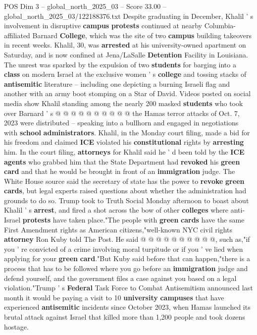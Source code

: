 \begin{textsample}{POS Dim 3 – global\_north\_2025\_03 – Score 33.00 – global\_north\_2025\_03/122188376.txt}
Despite graduating in December, Khalil ' s involvement in disruptive \textbf{campus} \textbf{protests} continued at nearby Columbia-affiliated Barnard \textbf{College}, which was the site of two \textbf{campus} building takeovers in recent weeks.
Khalil, 30, was \textbf{arrested} at his university-owned apartment on Saturday, and is now confined at Jena/LaSalle \textbf{Detention} Facility in Louisiana.
The unrest was sparked by the expulsion of two \textbf{students} for barging into a \textbf{class} on modern Israel at the exclusive women ' s \textbf{college} and tossing stacks of \textbf{antisemitic} literature -- including one depicting a burning Israeli flag and another with an army boot stomping on a Star of David.
Videos posted on social media show Khalil standing among the nearly 200 masked \textbf{students} who took over Barnard ' s @ @ @ @ @ @ @ @ @ @ the Hamas terror attacks of Oct. 7, 2023 were distributed -- speaking into a bullhorn and engaged in negotiations with \textbf{school} \textbf{administrators}.
Khalil, in the Monday court filing, made a bid for his freedom and claimed \textbf{ICE} violated his \textbf{constitutional} rights by \textbf{arresting} him.
In the court filing, \textbf{attorneys} for Khalil said he ' d been told by the \textbf{ICE} \textbf{agents} who grabbed him that the State Department had \textbf{revoked} his \textbf{green} \textbf{card} and that he would be brought in front of an \textbf{immigration} judge.
The White House source said the secretary of state has the power to \textbf{revoke} \textbf{green} \textbf{cards}, but legal experts raised questions about whether the administration had grounds to do so.
Trump took to Truth Social Monday afternoon to boast about Khalil ' s \textbf{arrest}, and fired a shot across the bow of other \textbf{colleges} where anti-Israel \textbf{protests} have taken place."The people with \textbf{green} \textbf{cards} have the same First Amendment rights as American citizens,"well-known NYC civil rights \textbf{attorney} Ron Kuby told The Post.
He said @ @ @ @ @ @ @ @ @ @, such as,"if you ' re convicted of a crime involving moral turpitude or if you ' ve lied when applying for your \textbf{green} \textbf{card}."But Kuby said before that can happen,"there is a process that has to be followed where you go before an \textbf{immigration} judge and defend yourself, and the government files a case against you based on a legal violation."Trump ' s \textbf{Federal} Task Force to Combat Antisemitism announced last month it would be paying a visit to 10 \textbf{university} \textbf{campuses} that have experienced \textbf{antisemitic} incidents since October 2023, when Hamas launched its brutal attack against Israel that killed more than 1,200 people and took dozens hostage.

\end{textsample}
